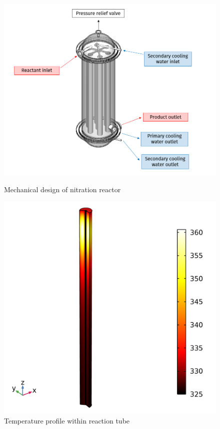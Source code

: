 \begin{figure}[h]
    \centering
    \begin{minipage}[t]{0.53\linewidth}
        \includegraphics[width=0.8\linewidth]{figures/FYD executive sum.PNG}
        \caption{Mechanical design of nitration reactor}
        \label{fig:executivesummaryreactor}
    \end{minipage}\hfill
    \begin{minipage}[t]{0.45\linewidth}
        \includegraphics[width=0.8\linewidth]{chapters/2-reaction/figures/temperature-surface.png}
        \caption{Temperature profile within reaction tube}
        \label{fig:reactor-comsol}
    \end{minipage}
\end{figure}

